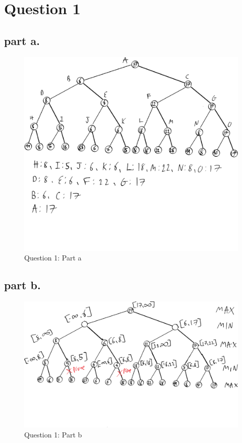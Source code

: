 \section{Question 1}
\subsection{part a.}

\begin{figure}[H]
	\centering
  \includegraphics[scale = 0.65]{q1_part_a.png}
	\caption{Question 1: Part a}
	\label{fig: Q1 Part a}
\end{figure}


\subsection{part b.}

\begin{figure}[H]
	\centering
  \includegraphics[scale = 0.65]{q1_part_b.png}
	\caption{Question 1: Part b}
	\label{fig: Q1 Part b}
\end{figure}



